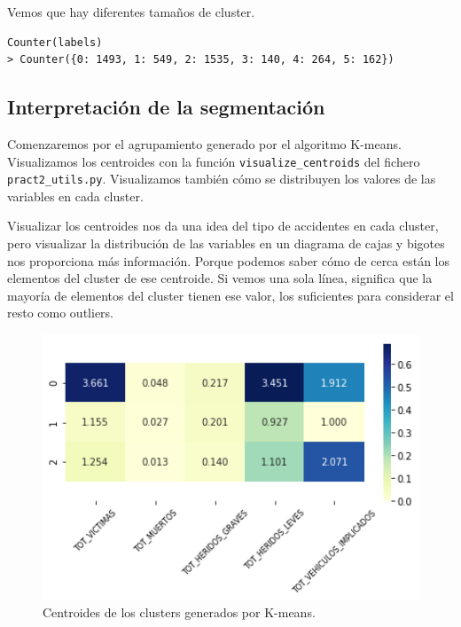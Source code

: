 \documentclass[oneside]{book}
\begin{document}
Vemos que hay diferentes tamaños de cluster.

\begin{verbatim}
Counter(labels)
> Counter({0: 1493, 1: 549, 2: 1535, 3: 140, 4: 264, 5: 162})
\end{verbatim}

\subsection{Interpretación de la
  segmentación} \label{sec:interpretacion1}

Comenzaremos por el agrupamiento generado por el algoritmo
K-means. Visualizamos los centroides con la función
\texttt{visualize\_centroids} del fichero \texttt{pract2\_utils.py}.
Visualizamos también cómo se distribuyen los valores de las variables
en cada cluster.

Visualizar los centroides nos da una idea del tipo de accidentes en
cada cluster, pero visualizar la distribución de las variables en un
diagrama de cajas y bigotes nos proporciona más información. Porque
podemos saber cómo de cerca están los elementos del cluster de ese
centroide. Si vemos una sola línea, significa que la mayoría de
elementos del cluster tienen ese valor, los suficientes para
considerar el resto como outliers.

\begin{figure}[H]
  \centering
  \includegraphics[width=120mm]{figures/accidentes/k-means1centroids}
  \caption{Centroides de los clusters generados por K-means.}
  \label{fig:k-means1centroids}
\end{figure}
\end{document}

